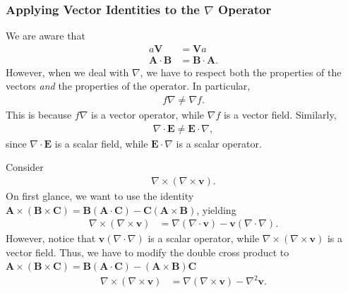 \documentclass[10pt]{mypackage}
\begin{document}
\subsubsection{Applying Vector Identities to the $\nabla$ Operator}%
We are aware that
\begin{align*}
  a\mathbf{V} &= \mathbf{V}a\\
  \mathbf{A}\cdot \mathbf{B} &= \mathbf{B}\cdot \mathbf{A}.
\end{align*}
However, when we deal with $\nabla$, we have to respect both the properties of the vectors \textit{and} the properties of the operator. In particular,
\begin{align*}
  f\nabla \neq \nabla f.
\end{align*}
This is because $f\nabla$ is a vector operator, while $\nabla f$ is a vector field. Similarly,
\begin{align*}
  \nabla \cdot \mathbf{E} \neq \mathbf{E}\cdot \nabla,
\end{align*}
since $\nabla \cdot \mathbf{E}$ is a scalar field, while $\mathbf{E}\cdot \nabla$ is a scalar operator.
\begin{example}
  Consider
  \begin{align*}
    \nabla \times \left(\nabla \times \mathbf{v}\right).
  \end{align*}
  On first glance, we want to use the identity $\mathbf{A}\times \left(\mathbf{B}\times \mathbf{C}\right) = \mathbf{B}\left(\mathbf{A}\cdot \mathbf{C}\right) - \mathbf{C}\left(\mathbf{A}\times \mathbf{B}\right)$, yielding
  \begin{align*}
    \nabla \times \left(\nabla \times \mathbf{v}\right) &= \nabla\left(\nabla \cdot \mathbf{v}\right) - \mathbf{v}\left(\nabla \cdot \nabla\right).
  \end{align*}
  However, notice that $\mathbf{v}\left(\nabla \cdot \nabla\right)$ is a scalar operator, while $\nabla \times \left(\nabla \times \mathbf{v}\right)$ is a vector field. Thus, we have to modify the double cross product to $\mathbf{A}\times \left(\mathbf{B}\times \mathbf{C}\right) = \mathbf{B}\left(\mathbf{A}\cdot \mathbf{C}\right) - \left(\mathbf{A}\times \mathbf{B}\right)\mathbf{C}$
  \begin{align*}
    \nabla \times \left(\nabla \times \mathbf{v}\right) &= \nabla\left(\nabla \times \mathbf{v}\right) - \nabla^2 \mathbf{v}.
  \end{align*}
\end{example}
\end{document}

